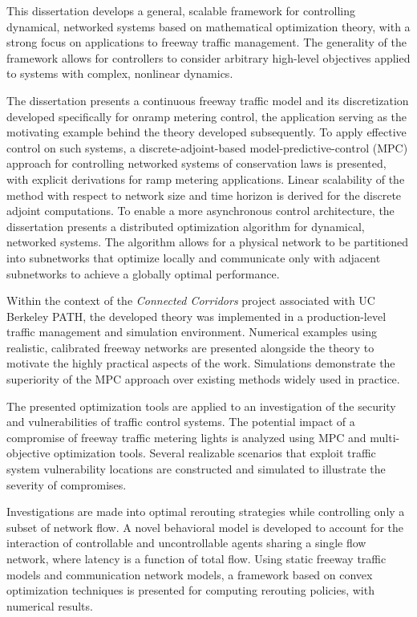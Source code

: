 This dissertation develops a general, scalable framework for controlling dynamical, networked systems based on mathematical optimization theory, with a strong focus on applications to freeway traffic management. The generality of the framework allows for controllers to consider arbitrary high-level objectives applied to systems with complex, nonlinear dynamics.

The dissertation presents a continuous freeway traffic model and its discretization developed specifically for onramp metering control, the application serving as the motivating example behind the theory developed subsequently. To apply effective control on such systems, a discrete-adjoint-based model-predictive-control (MPC) approach for controlling networked systems of conservation laws is presented, with explicit derivations for ramp metering applications. Linear scalability of the method with respect to network size and time horizon is derived for the discrete adjoint computations. To enable a more asynchronous control architecture, the dissertation presents a distributed optimization algorithm for dynamical, networked systems. The algorithm allows for a physical network to be partitioned into subnetworks that optimize locally and communicate only with adjacent subnetworks to achieve a globally optimal performance. 

Within the context of the \emph{Connected Corridors} project associated with UC Berkeley PATH, the developed theory was implemented in a production-level traffic management and simulation environment. Numerical examples using realistic, calibrated freeway networks are presented alongside the theory to motivate the highly practical aspects of the work. Simulations demonstrate the superiority of the MPC approach over existing methods widely used in practice.

The presented optimization tools are applied to an investigation of the security and vulnerabilities of traffic control systems. The potential impact of a compromise of freeway traffic metering lights is analyzed using MPC and multi-objective optimization tools. Several realizable scenarios that exploit traffic system vulnerability locations are constructed and simulated to illustrate the severity of compromises.

Investigations are made into optimal rerouting strategies while controlling only a subset of network flow. A novel behavioral model is developed to account for the interaction of controllable and uncontrollable agents sharing a single flow network, where latency is a function of total flow. Using static freeway traffic models and communication network models, a framework based on convex optimization techniques is presented for computing rerouting policies, with numerical results.

